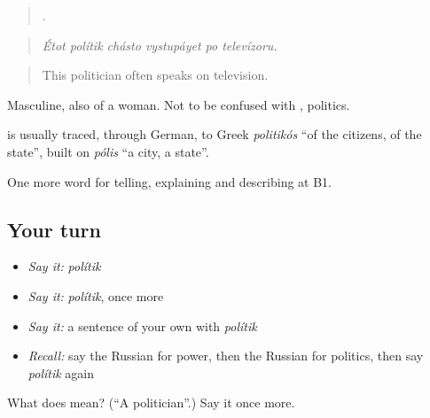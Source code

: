\begin{quote}
     .
\end{quote}

\begin{quote}
\emph{Étot polítik chásto vystupáyet po televízoru.}
\end{quote}

\begin{quote}
This politician often speaks on television.
\end{quote}

Masculine, also of a woman. Not to be confused with \emph{}, politics.

\begin{cousinweb}
\textbf{} is usually traced, through German, to Greek \emph{politikós} \textquotedblleft{}of the citizens, of the state\textquotedblright{}, built on \emph{pólis} \textquotedblleft{}a city, a state\textquotedblright{}.
\end{cousinweb}

\begin{grammarlens}[title={What you've built}]
One more word for telling, explaining and describing at B1.
\end{grammarlens}

\subsection*{Your turn}
\begin{itemize}
\raggedright
  \item \emph{Say it:} \emph{polítik}
  \item \emph{Say it:} \emph{polítik}, once more
  \item \emph{Say it:} a sentence of your own with \emph{polítik}
  \item \emph{Recall:} say the Russian for power, then the Russian for politics, then say \emph{polítik} again
\end{itemize}

\begin{tcolorbox}[breakable,colback=teal!4,colframe=teal!35!black,title={Before you move on}]
What does  mean? (\textquotedblleft{}A politician\textquotedblright{}.) Say it once more.
\end{tcolorbox}
